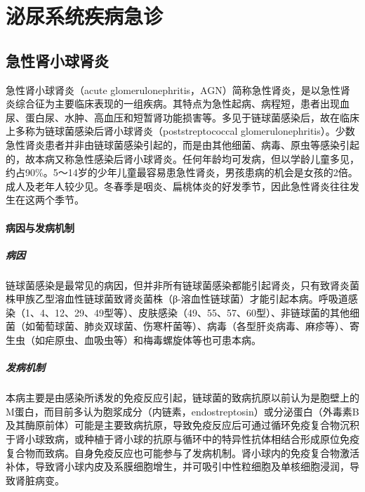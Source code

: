 \part{泌尿系统疾病急诊}

\chapter{急性肾小球肾炎}

急性肾小球肾炎（acute
glomerulonephritis，AGN）简称急性肾炎，是以急性肾炎综合征为主要临床表现的一组疾病。其特点为急性起病、病程短，患者出现血尿、蛋白尿、水肿、高血压和短暂肾功能损害等。多见于链球菌感染后，故在临床上多称为链球菌感染后肾小球肾炎（poststreptococcal
glomerulonephritis）。少数急性肾炎患者并非由链球菌感染引起的，而是由其他细菌、病毒、原虫等感染引起的，故本病又称急性感染后肾小球肾炎。任何年龄均可发病，但以学龄儿童多见，约占90\%。5～14岁的少年儿童最容易患急性肾炎，男孩患病的机会是女孩的2倍。成人及老年人较少见。冬春季是咽炎、扁桃体炎的好发季节，因此急性肾炎往往发生在这两个季节。

\subsection{病因与发病机制}

\subsubsection{病因}

链球菌感染是最常见的病因，但并非所有链球菌感染都能引起肾炎，只有致肾炎菌株甲族乙型溶血性链球菌致肾炎菌株（β-溶血性链球菌）才能引起本病。呼吸道感染（1、4、12、29、49型等）、皮肤感染（49、55、57、60型）、非链球菌的其他细菌（如葡萄球菌、肺炎双球菌、伤寒杆菌等）、病毒（各型肝炎病毒、麻疹等）、寄生虫（如疟原虫、血吸虫等）和梅毒螺旋体等也可患本病。

\subsubsection{发病机制}

本病主要是由感染所诱发的免疫反应引起，链球菌的致病抗原以前认为是胞壁上的M蛋白，而目前多认为胞浆成分（内链素，endostreptosin）或分泌蛋白（外毒素B及其酶原前体）可能是主要致病抗原，导致免疫反应后可通过循环免疫复合物沉积于肾小球致病，或种植于肾小球的抗原与循环中的特异性抗体相结合形成原位免疫复合物而致病。自身免疫反应也可能参与了发病机制。肾小球内的免疫复合物激活补体，导致肾小球内皮及系膜细胞增生，并可吸引中性粒细胞及单核细胞浸润，导致肾脏病变。

